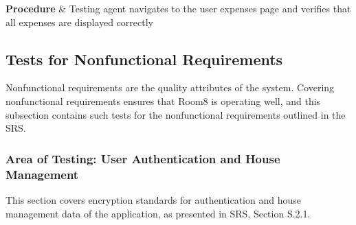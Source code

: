 \documentclass[12pt, titlepage]{article}
\begin{document}
\begin{center}
{    \textbf{Procedure} & Testing agent navigates to the user expenses page and verifies that all expenses are displayed correctly \\ 
  }
  

\end{center}

\subsection{Tests for Nonfunctional Requirements}
\label{subsec:testsForNonFunc}
Nonfunctional requirements are the quality attributes of the system. Covering nonfunctional requirements ensures that Room8 is operating well, and this subsection contains such tests for the nonfunctional requirements outlined in the SRS.

\subsubsection{Area of Testing: User Authentication and House Management}
This section covers encryption standards for authentication and house management data of the application, as presented in SRS, Section S.2.1.
\end{document}
